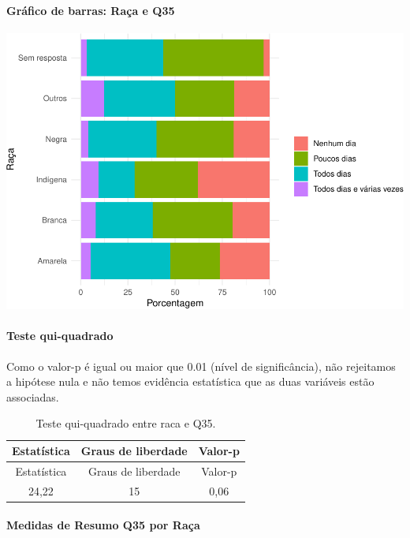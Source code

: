 \documentclass[]{article}
\let\oldparagraph\paragraph
\renewcommand{\paragraph}[1]{\oldparagraph{#1}\mbox{}}
\begin{document}
\hypertarget{gruxe1fico-de-barras-rauxe7a-e-q35}{%
\paragraph{Gráfico de barras: Raça e Q35}\label{gruxe1fico-de-barras-rauxe7a-e-q35}}

\begin{center}\includegraphics[width=0.75\linewidth]{relatorio_covid19_files/figure-latex/unnamed-chunk-1282-1} \end{center}

\hypertarget{teste-qui-quadrado-110}{%
\paragraph{Teste qui-quadrado}\label{teste-qui-quadrado-110}}

Como o valor-p é igual ou maior que 0.01 (nível de significância), não rejeitamos a hipótese nula e não temos evidência estatística que as duas variáveis estão associadas.

\begin{longtable}[]{@{}ccc@{}}
\caption{\label{tab:unnamed-chunk-1284}Teste qui-quadrado entre raca e Q35.}\tabularnewline
\toprule
Estatística & Graus de liberdade & Valor-p\tabularnewline
\midrule
\endfirsthead
\toprule
Estatística & Graus de liberdade & Valor-p\tabularnewline
\midrule
\endhead
24,22 & 15 & 0,06\tabularnewline
\bottomrule
\end{longtable}

\cleardoublepage

\hypertarget{medidas-de-resumo-q35-por-rauxe7a}{%
\paragraph{Medidas de Resumo Q35 por Raça}\label{medidas-de-resumo-q35-por-rauxe7a}}
\end{document}
